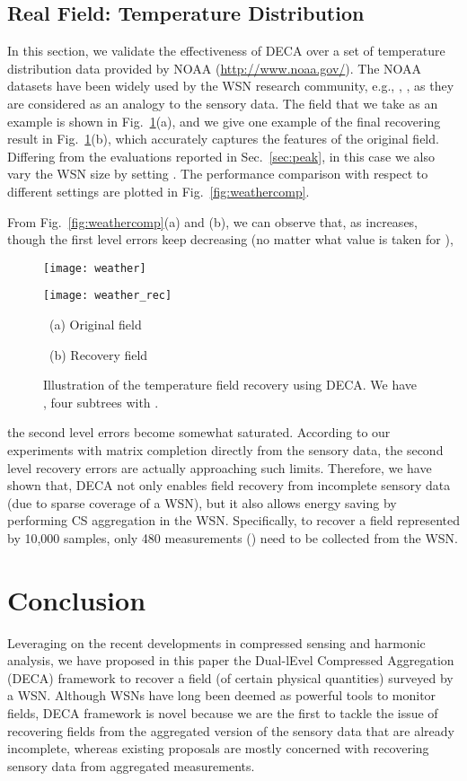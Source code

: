 \documentclass[conference]{IEEEtran}
\begin{document}
  \subsection{Real Field: Temperature Distribution}
In this section, we validate the effectiveness of DECA over a set of temperature distribution data provided by NOAA (\url{http://www.noaa.gov/}). The NOAA datasets have been widely used by the WSN research community, e.g., \cite{Gupta-ToSN08}, \cite{LuoWSC-MobiCom09}, as they are considered as an analogy to the sensory data. The field that we take as an example is shown in Fig.~\ref{fig:weatherillu}(a), and we give one example of the final recovering result in Fig.~\ref{fig:weatherillu}(b), which accurately captures the features of the original field. Differing from the evaluations reported in Sec.~\ref{sec:peak}, in this case we also vary the WSN size by setting . The performance comparison with respect to different settings are plotted in Fig.~\ref{fig:weathercomp}.

    From Fig.~\ref{fig:weathercomp}(a) and (b), we can observe that, as  increases, though the first level errors keep decreasing (no matter what value is taken for ),
    \begin{figure}[t]
      \begin{center}
\parbox{.49\columnwidth}{\center \texttt{[image: weather]}}
        \parbox{.49\columnwidth}{\center \texttt{[image: weather\_rec]}}
        \parbox{.49\columnwidth}{\center\scriptsize~(a) Original field}
        \parbox{.49\columnwidth}{\center\scriptsize~(b) Recovery field}
        \caption{Illustration of the temperature field recovery using DECA. We have , four subtrees with .}
        \label{fig:weatherillu}
      \end{center}
\end{figure}
the second level errors become somewhat saturated. According to our experiments with matrix completion directly from the sensory data, the second level recovery errors are actually approaching such limits. Therefore, we have shown that, DECA not only enables field recovery from incomplete sensory data (due to sparse coverage of a WSN), but it also allows energy saving by performing CS aggregation in the WSN. Specifically, to recover a field represented by 10,000 samples, only 480 measurements () need to be collected from the WSN.


\section{Conclusion} \label{sec:con}
Leveraging on the recent developments in compressed sensing and harmonic analysis, we have proposed in this paper the Dual-lEvel Compressed Aggregation (DECA) framework to recover a field (of certain physical quantities) surveyed by a WSN. Although WSNs have long been deemed as powerful tools to monitor fields, DECA framework is novel because we are the first to tackle the issue of recovering fields from the aggregated version of the sensory data that are already incomplete, whereas existing proposals are mostly concerned with recovering sensory data from aggregated measurements.
\end{document}

